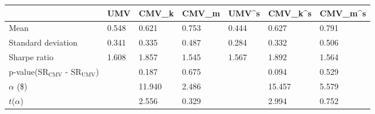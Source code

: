 \begin{tabular}{lllllll}
\toprule
 & UMV & CMV_k & CMV_m & UMV^s & CMV_k^s & CMV_m^s \\
\midrule
Mean & 0.548 & 0.621 & 0.753 & 0.444 & 0.627 & 0.791 \\
Standard deviation & 0.341 & 0.335 & 0.487 & 0.284 & 0.332 & 0.506 \\
Sharpe ratio & 1.608 & 1.857 & 1.545 & 1.567 & 1.892 & 1.564 \\
p-value(SR$_{\text{CMV}}$ - SR$_{\text{UMV}}$) &  & 0.187 & 0.675 &  & 0.094 & 0.529 \\
$\alpha$ (\$) &  & 11.940 & 2.486 &  & 15.457 & 5.579 \\
$t$($\alpha$) &  & 2.556 & 0.329 &  & 2.994 & 0.752 \\
\bottomrule
\end{tabular}
